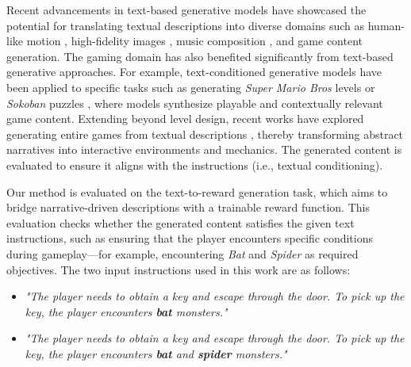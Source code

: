 Recent advancements in text-based generative models have showcased the potential for translating textual descriptions into diverse domains such as human-like motion \cite{guo2022generating}, high-fidelity images \cite{ramesh2022hierarchical}, music composition \cite{agostinelli2023musiclm}, and game content generation.
The gaming domain has also benefited significantly from text-based generative approaches. For example, text-conditioned generative models have been applied to specific tasks such as generating \textit{Super Mario Bros} levels \cite{sudhakaran2024mariogpt} or \textit{Sokoban} puzzles \cite{todd2023level}, where models synthesize playable and contextually relevant game content.
Extending beyond level design, recent works have explored generating entire games from textual descriptions \cite{zhang2024text, nasir2024word2world}, thereby transforming abstract narratives into interactive environments and mechanics.
The generated content is evaluated to ensure it aligns with the instructions (i.e., textual conditioning).

Our method is evaluated on the text-to-reward generation task, which aims to bridge narrative-driven descriptions with a trainable reward function. This evaluation checks whether the generated content satisfies the given text instructions, such as ensuring that the player encounters specific conditions during gameplay—for example, encountering \textit{Bat} and \textit{Spider} as required objectives. The two input instructions used in this work are as follows:

\begin{itemize}
\item \textit{"The player needs to obtain a key and escape through the door. To pick up the key, the player encounters \textbf{bat} monsters."}
\item \textit{"The player needs to obtain a key and escape through the door. To pick up the key, the player encounters \textbf{bat} and \textbf{spider} monsters."}
\end{itemize}


